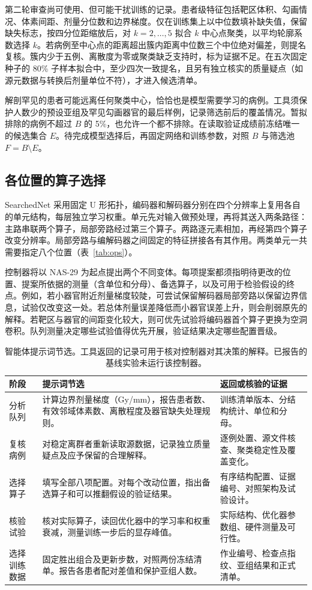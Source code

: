 \documentclass[UTF8,letterpaper,twocolumn,11pt,fontset=fandol]{ctexart}
\begin{document}
第二轮审查尚可使用、但可能干扰训练的记录。患者级特征包括靶区体积、勾画情况、体素间距、剂量分位数和边界梯度。仅在训练集上以中位数填补缺失值，保留缺失标志，按四分位距缩放后，对 $k=2,\ldots,5$ 拟合 $k$ 中心点聚类，以平均轮廓系数选择 $k$。若病例至中心点的距离超出簇内距离中位数三个中位绝对偏差，则提名复核。簇内少于五例、离散度为零或聚类缺乏支持时，标为证据不足。在五次固定种子的 80\% 子样本拟合中，至少四次一致提名，且另有独立核实的质量疑点（如源元数据与转换后剂量单位不符），才进入候选清单。

解剖罕见的患者可能远离任何聚类中心，恰恰也是模型需要学习的病例。工具须保护人数少的预设亚组及罕见勾画器官的最后样例，记录筛选前后的覆盖情况。暂拟排除的病例不超过 $B$ 的 5\%，也允许一个都不排除。在读取验证成绩前冻结唯一的候选集合 $E$。待完成模型选择后，再固定网络和训练参数，对照 $B$ 与筛选池 $F=B\setminus E$。

\subsection{各位置的算子选择}
SearchedNet 采用固定 U 形拓扑，编码器和解码器分别在四个分辨率上复用各自的单元结构，每层独立学习权重。单元先对输入做预处理，再将其送入两条路径：主路串联两个算子，局部旁路经过第三个算子。两路逐元素相加，再经第四个算子改变分辨率。局部旁路与编解码器之间固定的特征拼接各有其作用。两类单元一共需要指定八个位置（表~\ref{tab:ops}）。



控制器将以 NAS-29 为起点提出两个不同变体。每项提案都须指明待更改的位置、提案所依据的测量（含单位和分母）、备选算子，以及可用于检验假设的终点。例如，若小器官附近剂量梯度较陡，可尝试保留解码器局部旁路以保留边界信息，试验仅改变这一处。若总体剂量误差降低而小器官误差上升，则会削弱原先的解释。若靶区与器官的间距变化较大，则可优先试验将编码器首个算子更换为空洞卷积。队列测量决定哪些试验值得优先开展，验证结果决定哪些配置晋级。

\begin{table}[t]
\centering\small
\begin{tabular}{p{1.02in}p{3.36in}p{2.06in}}
\toprule
阶段 & 提示词节选 & 返回或核验的证据\\
\midrule
分析队列 & 计算边界剂量梯度（Gy/mm），报告患者数、有效邻域体素数、离散程度及器官缺失处理规则。 & 训练清单版本、分结构统计、单位和分母。\\
复核病例 & 对稳定离群者重新读取源数据，记录独立质量疑点及应予保留的合理解释。 & 逐例处置、源文件核查、聚类稳定性及覆盖变化。\\
选择算子 & 填写全部八项配置。对每个改动位置，指出备选算子和可以推翻假设的验证结果。 & 有序结构配置、证据编号、对照架构及试验设计。\\
核验试验 & 核对实际算子，读回优化器中的学习率和权重衰减，测量训练一步后的显存峰值。 & 实际结构、优化器参数组、硬件测量及可行性。\\
选择训练数据 & 固定胜出组合及更新步数，对照两份冻结清单。报告各患者配对差值和保护亚组人数。 & 作业编号、检查点指纹、亚组结果和正式清单。\\
\bottomrule
\end{tabular}
\caption{智能体提示词节选。工具返回的记录可用于核对控制器对其决策的解释。已报告的基线实验未运行该控制器。}
\label{tab:prompts}
\end{table}
\end{document}
